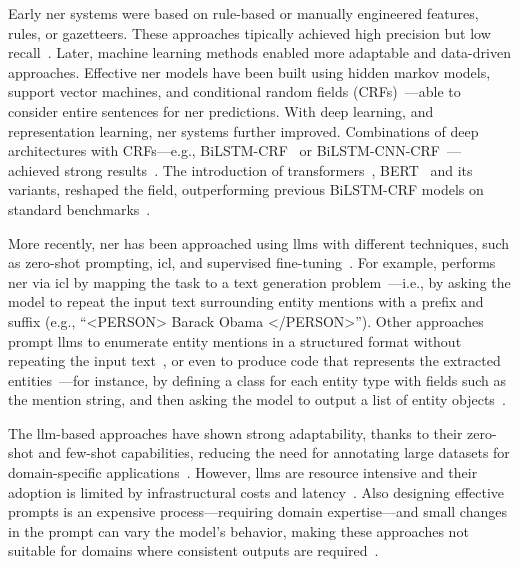 Early \ac{ner} systems were based on rule-based or manually engineered features, rules, or gazetteers. These approaches tipically achieved high precision but low recall~\cite{keraghel2024recentadvancesnamedentity}.
Later, machine learning methods enabled more adaptable and data-driven approaches. Effective \ac{ner} models have been built using hidden markov models, support vector machines, and conditional random fields (CRFs)~\cite{keraghel2024recentadvancesnamedentity}---able to consider entire sentences for \ac{ner} predictions.
With deep learning, and representation learning, \ac{ner} systems further improved. Combinations of deep architectures with CRFs---e.g., BiLSTM-CRF~\cite{riedl-pado-2018-named,schweter-baiter-2019-towards} or BiLSTM-CNN-CRF~\cite{ma-hovy-2016-end}---achieved strong results~\cite{keraghel2024recentadvancesnamedentity}. The introduction of transformers~\cite{vaswani_transformers_2017}, BERT~\cite{devlin-etal-2019-bert} and its variants, reshaped the field, outperforming previous BiLSTM-CRF models on standard benchmarks~\cite{keraghel2024recentadvancesnamedentity}.




More recently, \ac{ner} has been approached using \aclp{llm} with different techniques, such as zero-shot prompting, \acl{icl}, and supervised fine-tuning~\cite{xu2024llm_for_ie}. For example, \textcite{wang-etal-2025-gptner} performs \ac{ner} via \ac{icl} by mapping the task to a text generation problem~\cite{}---i.e., by asking the model to repeat the input text surrounding entity mentions with a prefix and suffix (e.g., ``<PERSON> Barack Obama </PERSON>''). Other approaches prompt \acp{llm} to enumerate entity mentions in a structured format without repeating the input text~\cite{xie-etal-2024-self}, or even to produce code that represents the extracted entities~\cite{sainz2024gollie,li-etal-2023-codeie}---for instance, by defining a class for each entity type with fields such as the mention string, and then asking the model to output a list of entity objects~\cite{sainz2024gollie}.

The \ac{llm}-based approaches have shown strong adaptability, thanks to their zero-shot and few-shot capabilities, reducing the need for annotating large datasets for domain-specific applications~\cite{keraghel2024recentadvancesnamedentity}. However, \acp{llm} are resource intensive and their adoption is limited by infrastructural costs and latency~\cite{keraghel2024recentadvancesnamedentity}. Also designing effective prompts is an expensive process---requiring domain expertise---and small changes in the prompt can vary the model's behavior, making these approaches not suitable for domains where consistent outputs are required~\cite{keraghel2024recentadvancesnamedentity}. 

